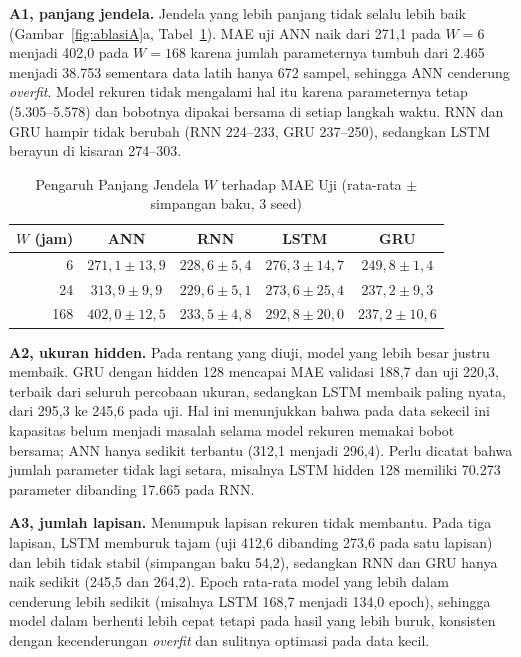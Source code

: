 \documentclass[conference,a4paper]{IEEEtran}
\begin{document}
\textbf{A1, panjang jendela.} Jendela yang lebih panjang tidak selalu lebih baik (Gambar~\ref{fig:ablasiA}a, Tabel~\ref{tab:W}). MAE uji ANN naik dari 271,1 pada $W=6$ menjadi 402,0 pada $W=168$ karena jumlah parameternya tumbuh dari 2.465 menjadi 38.753 sementara data latih hanya 672 sampel, sehingga ANN cenderung \emph{overfit}. Model rekuren tidak mengalami hal itu karena parameternya tetap (5.305--5.578) dan bobotnya dipakai bersama di setiap langkah waktu. RNN dan GRU hampir tidak berubah (RNN 224--233, GRU 237--250), sedangkan LSTM berayun di kisaran 274--303.

\begin{table}[t]
\centering
\caption{Pengaruh Panjang Jendela $W$ terhadap MAE Uji (rata-rata $\pm$ simpangan baku, 3 seed)}
\label{tab:W}
\footnotesize
\setlength{\tabcolsep}{3pt}
\begin{tabular}{@{}rcccc@{}}
\toprule
$W$ (jam) & ANN & RNN & LSTM & GRU \\
\midrule
6   & $271{,}1\pm13{,}9$ & $228{,}6\pm5{,}4$  & $276{,}3\pm14{,}7$ & $249{,}8\pm1{,}4$ \\
24  & $313{,}9\pm9{,}9$  & $229{,}6\pm5{,}1$  & $273{,}6\pm25{,}4$ & $237{,}2\pm9{,}3$ \\
168 & $402{,}0\pm12{,}5$ & $233{,}5\pm4{,}8$  & $292{,}8\pm20{,}0$ & $237{,}2\pm10{,}6$ \\
\bottomrule
\end{tabular}
\end{table}

\textbf{A2, ukuran hidden.} Pada rentang yang diuji, model yang lebih besar justru membaik. GRU dengan hidden 128 mencapai MAE validasi 188,7 dan uji 220,3, terbaik dari seluruh percobaan ukuran, sedangkan LSTM membaik paling nyata, dari 295,3 ke 245,6 pada uji. Hal ini menunjukkan bahwa pada data sekecil ini kapasitas belum menjadi masalah selama model rekuren memakai bobot bersama; ANN hanya sedikit terbantu (312,1 menjadi 296,4). Perlu dicatat bahwa jumlah parameter tidak lagi setara, misalnya LSTM hidden 128 memiliki 70.273 parameter dibanding 17.665 pada RNN.

\textbf{A3, jumlah lapisan.} Menumpuk lapisan rekuren tidak membantu. Pada tiga lapisan, LSTM memburuk tajam (uji 412,6 dibanding 273,6 pada satu lapisan) dan lebih tidak stabil (simpangan baku 54,2), sedangkan RNN dan GRU hanya naik sedikit (245,5 dan 264,2). Epoch rata-rata model yang lebih dalam cenderung lebih sedikit (misalnya LSTM 168,7 menjadi 134,0 epoch), sehingga model dalam berhenti lebih cepat tetapi pada hasil yang lebih buruk, konsisten dengan kecenderungan \emph{overfit} dan sulitnya optimasi pada data kecil.
\end{document}
